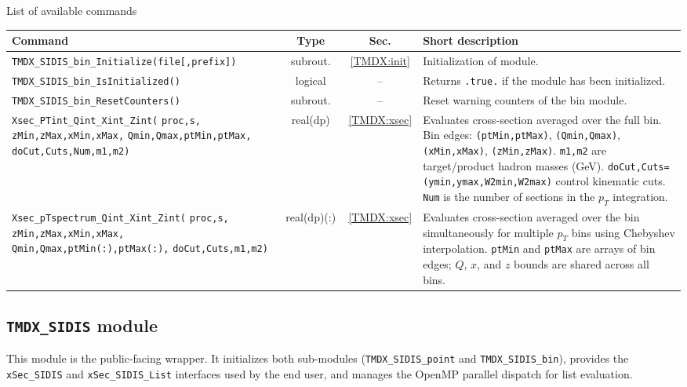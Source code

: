 \documentclass[prd,nofootinbib,eqsecnum,final]{revtex4}
\renewcommand{\(}{\left(}
\renewcommand{\)}{\right)}
\renewcommand{\[}{\left[}
\renewcommand{\]}{\right]}
\begin{document}
\begin{center}
List of available commands
\\
\begin{tabular}{||p{6cm}|c|c|p{8cm}||}
\hline\hline
Command & ~~Type~~& ~~Sec.~~ & Short description
\\\hline
\texttt{TMDX{\_}SIDIS{\_}bin{\_}Initialize(file[,prefix])} & subrout. & \ref{TMDX:init} & Initialization of module.
\\\hline
\texttt{TMDX{\_}SIDIS{\_}bin{\_}IsInitialized()} & logical & -- & Returns \texttt{.true.} if the module has been initialized.
\\\hline
\texttt{TMDX{\_}SIDIS{\_}bin{\_}ResetCounters()} & subrout. & -- & Reset warning counters of the bin module.
\\\hline
\texttt{Xsec{\_}PTint{\_}Qint{\_}Xint{\_}Zint(} \texttt{proc,s,} \texttt{zMin,zMax,xMin,xMax,} \texttt{Qmin,Qmax,ptMin,ptMax,} \texttt{doCut,Cuts,Num,m1,m2)} & real(dp) &\ref{TMDX:xsec} & Evaluates cross-section averaged over the full bin. Bin edges: \texttt{(ptMin,ptMax)}, \texttt{(Qmin,Qmax)}, \texttt{(xMin,xMax)}, \texttt{(zMin,zMax)}. \texttt{m1,m2} are target/product hadron masses (GeV). \texttt{doCut,Cuts=(ymin,ymax,W2min,W2max)} control kinematic cuts. \texttt{Num} is the number of sections in the $p_T$ integration.
\\\hline
\texttt{Xsec{\_}pTspectrum{\_}Qint{\_}Xint{\_}Zint(} \texttt{proc,s,} \texttt{zMin,zMax,xMin,xMax,} \texttt{Qmin,Qmax,ptMin(:),ptMax(:),} \texttt{doCut,Cuts,m1,m2)} & real(dp)(:) &\ref{TMDX:xsec} & Evaluates cross-section averaged over the bin simultaneously for multiple $p_T$ bins using Chebyshev interpolation. \texttt{ptMin} and \texttt{ptMax} are arrays of bin edges; $Q$, $x$, and $z$ bounds are shared across all bins.
\\\hline\hline
\end{tabular}
\end{center}

\subsection{\texttt{TMDX{\_}SIDIS} module}

This module is the public-facing wrapper. It initializes both sub-modules (\texttt{TMDX\_SIDIS\_point} and \texttt{TMDX\_SIDIS\_bin}), provides the \texttt{xSec\_SIDIS} and \texttt{xSec\_SIDIS\_List} interfaces used by the end user, and manages the OpenMP parallel dispatch for list evaluation.
\end{document}
